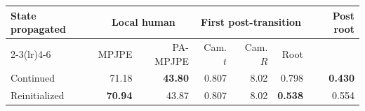 \begin{tabular}{lrrrrrr}
  \toprule
  \multirow{2}{*}{State propagated} & \multicolumn{2}{c}{Local human} &
  \multicolumn{3}{c}{First post-transition} & \multirow{2}{*}{Post root} \\
  \cmidrule(lr){2-3}\cmidrule(lr){4-6}
  & MPJPE & PA-MPJPE & Cam. $t$ & Cam. $R$ & Root & \\
  \midrule
  Continued & 71.18 & \textbf{43.80} & 0.807 & 8.02 & 0.798 & \textbf{0.430} \\
  Reinitialized & \textbf{70.94} & 43.87 & 0.807 & 8.02 & \textbf{0.538} & 0.554 \\
  \bottomrule
\end{tabular}

